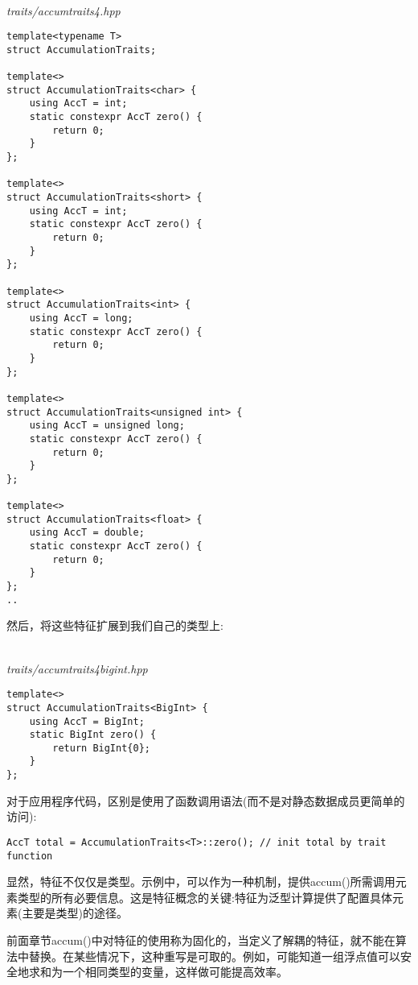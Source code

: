 \hspace*{\fill} \\ %
\noindent
\textit{traits/accumtraits4.hpp}
\begin{lstlisting}[style=styleCXX]
template<typename T>
struct AccumulationTraits;

template<>
struct AccumulationTraits<char> {
	using AccT = int;
	static constexpr AccT zero() {
		return 0;
	}
};

template<>
struct AccumulationTraits<short> {
	using AccT = int;
	static constexpr AccT zero() {
		return 0;
	}
};

template<>
struct AccumulationTraits<int> {
	using AccT = long;
	static constexpr AccT zero() {
		return 0;
	}
};

template<>
struct AccumulationTraits<unsigned int> {
	using AccT = unsigned long;
	static constexpr AccT zero() {
		return 0;
	}
};

template<>
struct AccumulationTraits<float> {
	using AccT = double;
	static constexpr AccT zero() {
		return 0;
	}
};
..
\end{lstlisting}

然后，将这些特征扩展到我们自己的类型上:

\hspace*{\fill} \\ %
\noindent
\textit{traits/accumtraits4bigint.hpp}
\begin{lstlisting}[style=styleCXX]
template<>
struct AccumulationTraits<BigInt> {
	using AccT = BigInt;
	static BigInt zero() {
		return BigInt{0};
	}
};
\end{lstlisting}

对于应用程序代码，区别是使用了函数调用语法(而不是对静态数据成员更简单的访问):

\begin{lstlisting}[style=styleCXX]
AccT total = AccumulationTraits<T>::zero(); // init total by trait function
\end{lstlisting}

显然，特征不仅仅是类型。示例中，可以作为一种机制，提供accum()所需调用元素类型的所有必要信息。这是特征概念的关键:特征为泛型计算提供了配置具体元素(主要是类型)的途径。


前面章节accum()中对特征的使用称为固化的，当定义了解耦的特征，就不能在算法中替换。在某些情况下，这种重写是可取的。例如，可能知道一组浮点值可以安全地求和为一个相同类型的变量，这样做可能提高效率。


